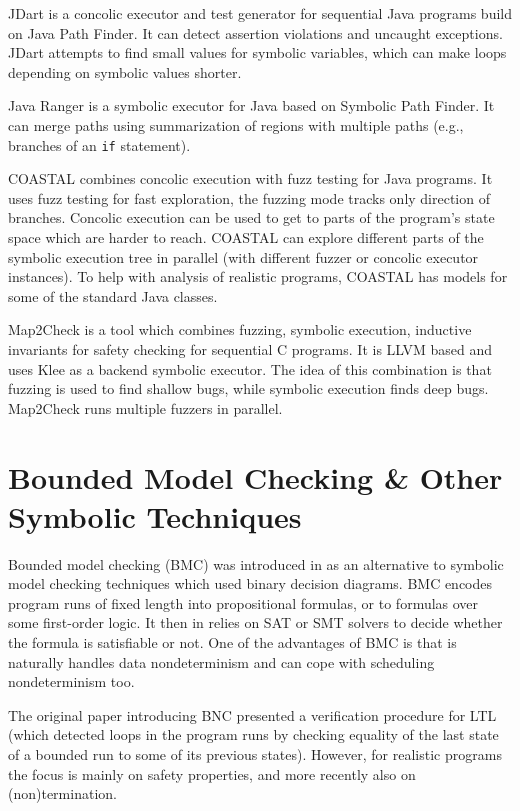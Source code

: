 JDart  is a concolic executor and test generator for sequential Java programs build on Java Path Finder.
It can detect assertion violations and uncaught exceptions.
JDart attempts to find small values for symbolic variables, which can make loops depending on symbolic values shorter.

Java Ranger  is a symbolic executor for Java based on Symbolic Path Finder.
It can merge paths using summarization of regions with multiple paths (e.g., branches of an \texttt{if} statement). %

COASTAL  combines concolic execution with fuzz testing for Java programs.
It uses fuzz testing for fast exploration, the fuzzing mode tracks only direction of branches.
Concolic execution can be used to get to parts of the program's state space which are harder to reach.
COASTAL can explore different parts of the symbolic execution tree in parallel (with different fuzzer or concolic executor instances).
To help with analysis of realistic programs, COASTAL has models for some of the standard Java classes. %

Map2Check  is a tool which combines fuzzing, symbolic execution, inductive invariants for safety checking for sequential C programs.
It is LLVM based and uses Klee as a backend symbolic executor.
The idea of this combination is that fuzzing is used to find shallow bugs, while symbolic execution finds deep bugs.
Map2Check runs multiple fuzzers in parallel.



\section{Bounded Model Checking \& Other Symbolic Techniques}\label{sec:stateoftheart:bmc}

Bounded model checking (BMC) was introduced in  as an alternative to
symbolic model checking techniques which used binary decision diagrams.
BMC encodes program runs of fixed length into propositional formulas, or to
formulas over some first-order logic.
It then in relies on SAT or SMT solvers to decide whether the formula is satisfiable
or not.
One of the advantages of BMC is that is naturally handles data nondeterminism and can cope with scheduling nondeterminism too.

The original paper introducing BNC presented a verification procedure for LTL
(which detected loops in the program runs by checking equality of the last
state of a bounded run to some of its previous states).
However, for realistic programs the focus is mainly on safety properties, and
more recently also on (non)termination.

